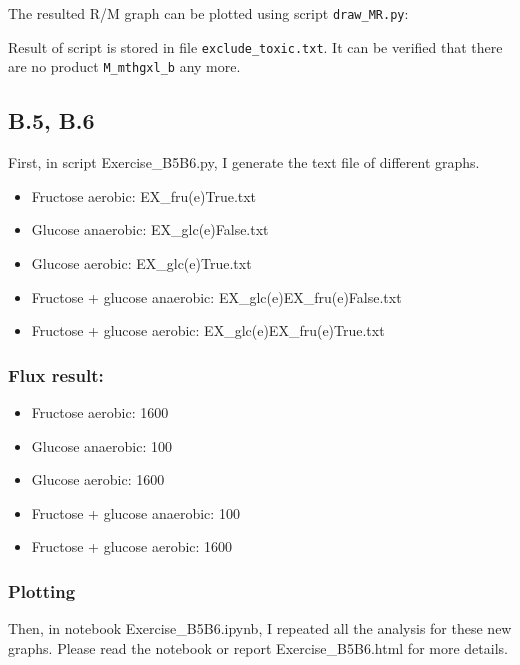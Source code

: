 \documentclass[]{article}
\newenvironment{Shaded}{}{}
\newcommand{\ExtensionTok}[1]{#1}
\newcommand{\NormalTok}[1]{#1}
\begin{document}
The resulted R/M graph can be plotted using script \texttt{draw\_MR.py}:

\begin{Shaded}
\end{Shaded}

Result of script is stored in file \texttt{exclude\_toxic.txt}. It can
be verified that there are no product \texttt{M\_mthgxl\_b} any more.

\hypertarget{header-n73}{%
\subsection{B.5, B.6}\label{header-n73}}

First, in script Exercise\_B5B6.py, I generate the text file of
different graphs.

\begin{itemize}
\item
  Fructose aerobic: EX\_fru(e)True.txt
\item
  Glucose anaerobic: EX\_glc(e)False.txt
\item
  Glucose aerobic: EX\_glc(e)True.txt
\item
  Fructose + glucose anaerobic: EX\_glc(e)EX\_fru(e)False.txt
\item
  Fructose + glucose aerobic: EX\_glc(e)EX\_fru(e)True.txt
\end{itemize}

\hypertarget{header-n92}{%
\subsubsection{Flux result:}\label{header-n92}}

\begin{itemize}
\item
  Fructose aerobic: 1600
\item
  Glucose anaerobic: 100
\item
  Glucose aerobic: 1600
\item
  Fructose + glucose anaerobic: 100
\item
  Fructose + glucose aerobic: 1600
\end{itemize}

\hypertarget{header-n109}{%
\subsubsection{Plotting}\label{header-n109}}

Then, in notebook Exercise\_B5B6.ipynb, I repeated all the analysis for
these new graphs. Please read the notebook or report Exercise\_B5B6.html
for more details.
\end{document}
